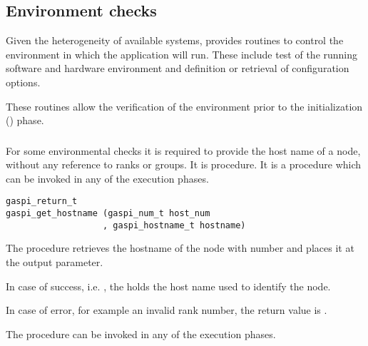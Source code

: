 \subsection{Environment checks}
\label{sec:EnvChecks}

Given the heterogeneity of available systems, \GASPI{} provides
routines to control the environment in which the application will
run. These include test of the running software and hardware
environment and definition or retrieval of configuration options.

These routines allow the verification of the environment prior to the
initialization () phase.

\subsubsection{}

For some environmental checks it is required to provide the host name
of a node, without any reference to ranks or groups. It is
  procedure.
It is a procedure
which can be invoked in any of the \GASPI{} execution phases.

\begin{FDef}
\begin{FDefSign}
\begin{verbatim}
gaspi_return_t
gaspi_get_hostname (gaspi_num_t host_num
                   , gaspi_hostname_t hostname)
\end{verbatim}
\end{FDefSign}
\parameterlistbegin
{}
\parameterlistend
\FStdRetDescNOTimeout
\end{FDef}

The procedure  retrieves the hostname of
the node with number  and places it at
the  output parameter.

In case of success, i.e. \GASPISUCC{}, the  holds
the host name used to identify the node.

In case of error, for example an invalid rank number, the return value
is \GASPIGERR{}.

The procedure can be invoked in any of the \GASPI{} execution phases.

\subsubsection{}

